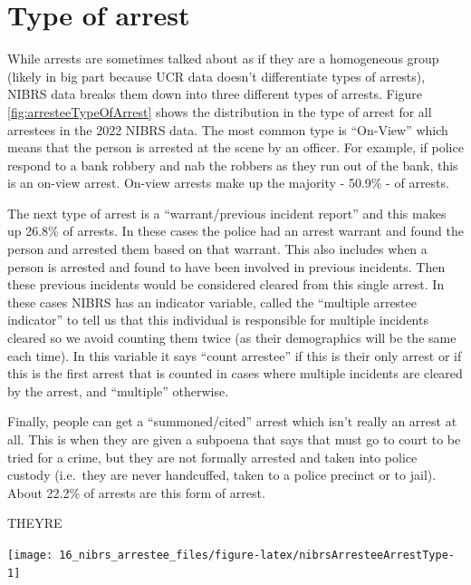 \documentclass[
]{krantz}
\let\origfigure\figure
\let\endorigfigure\endfigure
\renewenvironment{figure}[1][2] {
    \expandafter\origfigure\expandafter[H]
} {
    \endorigfigure
}
\begin{document}
\section{Type of arrest}\label{type-of-arrest}

While arrests are sometimes talked about as if they are a
homogeneous group (likely in big part because UCR data
doesn't differentiate types of arrests), NIBRS data breaks
them down into three different types of arrests. Figure
\ref{fig:arresteeTypeOfArrest} shows the distribution in the
type of arrest for all arrestees in the 2022 NIBRS data. The
most common type is ``On-View'' which means that the person
is arrested at the scene by an officer. For example, if
police respond to a bank robbery and nab the robbers as they
run out of the bank, this is an on-view arrest. On-view
arrests make up the majority - 50.9\% - of arrests.

The next type of arrest is a ``warrant/previous incident
report'' and this makes up 26.8\% of arrests. In these cases
the police had an arrest warrant and found the person and
arrested them based on that warrant. This also includes when
a person is arrested and found to have been involved in
previous incidents. Then these previous incidents would be
considered cleared from this single arrest. In these cases
NIBRS has an indicator variable, called the ``multiple
arrestee indicator'' to tell us that this individual is
responsible for multiple incidents cleared so we avoid
counting them twice (as their demographics will be the same
each time). In this variable it says ``count arrestee'' if
this is their only arrest or if this is the first arrest
that is counted in cases where multiple incidents are
cleared by the arrest, and ``multiple'' otherwise.

Finally, people can get a ``summoned/cited'' arrest which
isn't really an arrest at all. This is when they are given a
subpoena that says that must go to court to be tried for a
crime, but they are not formally arrested and taken into
police custody (i.e.~they are never handcuffed, taken to a
police precinct or to jail). About 22.2\% of arrests are
this form of arrest.

THEYRE

\begin{figure}

{\centering \texttt{[image: 16\_nibrs\_arrestee\_files/figure-latex/nibrsArresteeArrestType-1]} 

}

\caption{Annual arrest type for all arrestees, 1991-2022. Previous Incident Report includes cases where an individual was arrested for a separate crime and are then reported as also arrested for this incident.}\label{fig:nibrsArresteeArrestType}
\end{figure}
\end{document}
